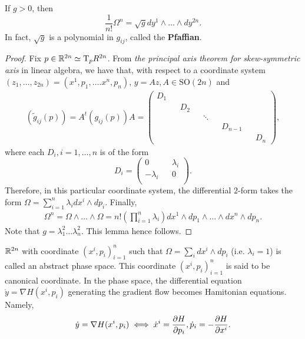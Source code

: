 \begin{lemma}
	If $g>0$, then
	\[\frac{1}{n!}\Omega^n = \sqrt{g} dy^1 \wedge \dots \wedge dy^{2n}.\]
	In fact, $\sqrt{g}$ is a polynomial in $g_{ij}$, called the \textbf{Pfaffian}.
\end{lemma}
\begin{proof}
	Fix $p \in \mathbb{R}^{2n} \simeq \mathrm{T}_{p}R^{2n}$. From \emph{the principal axis theorem for skew-symmetric axis} in linear algebra, we have that, with respect to a coordinate system $(z_1, \dots, z_{2n}) = (x^1, p_1, \dots. x^n, p_n)$, $y = Az, A \in \mathrm{SO}(2n)$ and
	\begin{eqnarray}
		(\tilde{g}_{ij}(p)) = A^{t}(g_{ij}(p)) A = 
		\begin{pmatrix}
			D_1 &&     &&    	 &&    		&&		\\
			    && D_2 &&        &&	   		&&		\\
			    &&     && \ddots &&			&&		\\
			    &&	   && 		 && D_{n-1} &&		\\
			    &&     &&        && 		&&  D_n
		\end{pmatrix},
	\end{eqnarray}
	where each $D_i, i = 1, \dots, n$ is of the form
	\[ D_i =
	\begin{pmatrix}
				 0&&	\lambda_i\\
		-\lambda_i&&			0\\
	\end{pmatrix}.\]
	Therefore, in this particular coordinate system, the differential $2$-form takes the form $\Omega = \sum_{i = 1}^{n} \lambda_i dx^i \wedge dp_i$. Finally,
	\begin{eqnarray}
		\Omega^n = \Omega \wedge \dots \wedge \Omega = n! \left(\prod_{i = 1}^{n} \lambda_i \right) dx^1 \wedge dp_1 \wedge \dots \wedge dx^n \wedge dp_n.
	\end{eqnarray}
	Note that $g = \lambda_1^2 \dots \lambda_n^2$. This lemma hence follows.
\end{proof}

\begin{definition}
	$\mathbb{R}^{2n}$ with coordinate $(x^i, p_i)_{i = 1}^{n}$ such that $\Omega = \sum_i dx^i \wedge dp_i$ (i.e. $\lambda_i = 1$) is called an abstract phase space. This coordinate $(x^i, p_i)_{i = 1}^{n}$ is said to be canonical coordinate. In the phase space, the differential equation $\dot{y} = \nabla H(x^i, p_i)$ generating the gradient flow becomes Hamitonian equations. Namely, \[ \dot{y} = \nabla H(x^i, p_i) \iff \dot{x}^i = \frac{ \partial H}{ \partial p_i }, \dot{p}_i = -\frac{ \partial H}{ \partial x^i }.\]
\end{definition}

